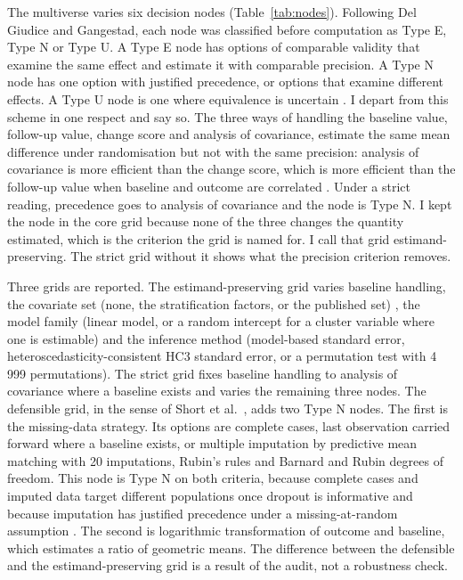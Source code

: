 The multiverse varies six decision nodes (Table~\ref{tab:nodes}). Following Del Giudice and Gangestad, each node was classified before computation as Type E, Type N or Type U. A Type E node has options of comparable validity that examine the same effect and estimate it with comparable precision. A Type N node has one option with justified precedence, or options that examine different effects. A Type U node is one where equivalence is uncertain \cite{Del_Giudice_2021}. I depart from this scheme in one respect and say so. The three ways of handling the baseline value, follow-up value, change score and analysis of covariance, estimate the same mean difference under randomisation but not with the same precision: analysis of covariance is more efficient than the change score, which is more efficient than the follow-up value when baseline and outcome are correlated \cite{Vickers_2001,Senn_2006,Van_Breukelen_2006}. Under a strict reading, precedence goes to analysis of covariance and the node is Type N. I kept the node in the core grid because none of the three changes the quantity estimated, which is the criterion the grid is named for. I call that grid estimand-preserving. The strict grid without it shows what the precision criterion removes.

Three grids are reported. The estimand-preserving grid varies baseline handling, the covariate set (none, the stratification factors, or the published set) \cite{Kahan_2014,Kahan_2012}, the model family (linear model, or a random intercept for a cluster variable where one is estimable) and the inference method (model-based standard error, heteroscedasticity-consistent HC3 standard error, or a permutation test with 4 999 permutations). The strict grid fixes baseline handling to analysis of covariance where a baseline exists and varies the remaining three nodes. The defensible grid, in the sense of Short et al.~\cite{Short_2026}, adds two Type N nodes. The first is the missing-data strategy. Its options are complete cases, last observation carried forward where a baseline exists, or multiple imputation by predictive mean matching with 20 imputations, Rubin's rules and Barnard and Rubin degrees of freedom. This node is Type N on both criteria, because complete cases and imputed data target different populations once dropout is informative and because imputation has justified precedence under a missing-at-random assumption \cite{White_2011}. The second is logarithmic transformation of outcome and baseline, which estimates a ratio of geometric means. The difference between the defensible and the estimand-preserving grid is a result of the audit, not a robustness check.


